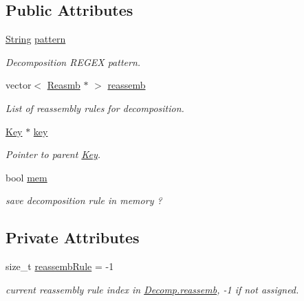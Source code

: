 \subsection*{Public Attributes}
\begin{DoxyCompactItemize}
\item 
\mbox{\label{classDecomp_aa306bb725aade0708e3796b362b7eb50}} 
\mbox{\hyperlink{classString}{String}} \mbox{\hyperlink{classDecomp_aa306bb725aade0708e3796b362b7eb50}{pattern}}
\begin{DoxyCompactList}\small\item\em Decomposition R\+E\+G\+EX pattern. \end{DoxyCompactList}\item 
\mbox{\label{classDecomp_a2ca89dea0471f80c7921955fafdf8513}} 
vector$<$ \mbox{\hyperlink{classReasmb}{Reasmb}} $\ast$ $>$ \mbox{\hyperlink{classDecomp_a2ca89dea0471f80c7921955fafdf8513}{reassemb}}
\begin{DoxyCompactList}\small\item\em List of reassembly rules for decomposition. \end{DoxyCompactList}\item 
\mbox{\label{classDecomp_aac5121057365009504733971b61b5144}} 
\mbox{\hyperlink{classKey}{Key}} $\ast$ \mbox{\hyperlink{classDecomp_aac5121057365009504733971b61b5144}{key}}
\begin{DoxyCompactList}\small\item\em Pointer to parent \mbox{\hyperlink{classKey}{Key}}. \end{DoxyCompactList}\item 
\mbox{\label{classDecomp_a31c944c87ebaa500f277279de14e382e}} 
bool \mbox{\hyperlink{classDecomp_a31c944c87ebaa500f277279de14e382e}{mem}}
\begin{DoxyCompactList}\small\item\em save decomposition rule in memory ? \end{DoxyCompactList}\end{DoxyCompactItemize}
\subsection*{Private Attributes}
\begin{DoxyCompactItemize}
\item 
\mbox{\label{classDecomp_ad0e34d40664740f5d4743474ed607262}} 
size\+\_\+t \mbox{\hyperlink{classDecomp_ad0e34d40664740f5d4743474ed607262}{reassemb\+Rule}} = -\/1
\begin{DoxyCompactList}\small\item\em current reassembly rule index in \mbox{\hyperlink{classDecomp_a2ca89dea0471f80c7921955fafdf8513}{Decomp.\+reassemb}}, -\/1 if not assigned. \end{DoxyCompactList}\end{DoxyCompactItemize}
